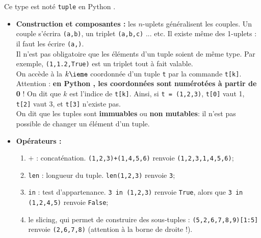 \begin{defi}[Tuple]
Ce type est noté \texttt{tuple} en Python .
\begin{itemize}
\item \textbf{Construction et composantes :} les $n$-uplets généralisent les couples. Un couple s'écrira \texttt{(a,b)}, un triplet 
\texttt{(a,b,c)} ... etc. Il existe même des 1-uplets : il faut les écrire \texttt{(a,)}.\\%
Il n'est pas obligatoire que les éléments d'un tuple soient de même type. Par exemple, 
\texttt{(1,1.2,True)} est un triplet tout à fait valable.\\
On accède à la $k\ieme$ coordonnée d'un tuple \texttt{t} par la commande \texttt{t[k]}. Attention : 
\textbf{en Python , les coordonnées sont numérotées à partir de 0} ! On dit que $k$ est 
l'{indice} de \texttt{t[k]}. Ainsi, si \texttt{t = (1,2,3)}, \texttt{t[0]} vaut 1, 
\texttt{t[2]} vaut 3, et \texttt{t[3]} n'existe pas.\\
On dit que les tuples sont \textbf{immuables} ou \textbf{non mutables}: il n'est pas possible de changer un élément d'un 
tuple.
\item \textbf{Opérateurs :}
\begin{enumerate}
 \item $+$ : concaténation. \texttt{(1,2,3)+(1,4,5,6)} renvoie \texttt{(1,2,3,1,4,5,6)};
 \item \texttt{len} : {longueur} du tuple. \texttt{len(1,2,3)} renvoie \texttt{3};
 \item \texttt{in} : test d'appartenance. \texttt{3 in (1,2,3)} renvoie \texttt{True}, alors que 
\texttt{3 in (1,2,4,5)} renvoie \texttt{False};
\item le {slicing}, qui permet de construire des sous-tuples : \texttt{(5,2,6,7,8,9)[1:5]} 
renvoie \texttt{(2,6,7,8)} (attention à la borne de droite !).\\
\end{enumerate}
\end{itemize}
\end{defi}

